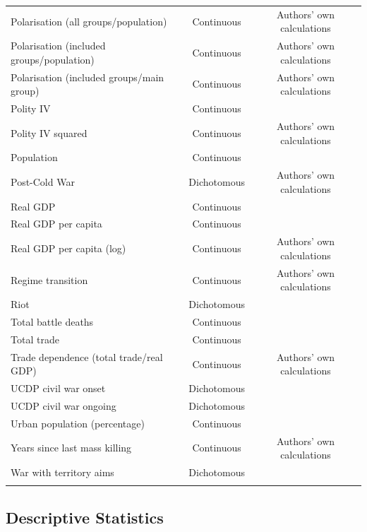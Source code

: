 \begin{table}[!htbp]
\begin{tabular}{@{\extracolsep{5pt}}lcc}
Polarisation (all groups/population) & Continuous &  Authors' own calculations  \\ 
Polarisation (included groups/population) & Continuous &  Authors' own calculations  \\ 
Polarisation (included groups/main group) & Continuous &  Authors' own calculations  \\ 
Polity IV & Continuous & \citet{marshall2017pitf}\\ 
Polity IV squared & Continuous & Authors' own calculations \\ 
Population & Continuous & \citet{gleditsch2002expanded} \\
Post-Cold War & Dichotomous & Authors' own calculations \\ 
Real GDP & Continuous & \citet{gleditsch2002expanded} \\ 
Real GDP per capita & Continuous & \citet{gleditsch2002expanded} \\ 
Real GDP per capita (log) & Continuous & Authors' own calculations  \\ 
Regime transition & Continuous & Authors' own calculations \\ 
Riot & Dichotomous & \citet{banks1999cross}\\ 
Total battle deaths & Continuous & \citet{lacina2005monitoring} \\  
Total trade & Continuous & \citet{cow2017cinc} \\ 
Trade dependence (total trade/real GDP) & Continuous & Authors' own calculations \\ 
UCDP civil war onset & Dichotomous & \citet{allansson2017organized,gleditsch2002armed} \\ 
UCDP civil war ongoing & Dichotomous & \citet{allansson2017organized,gleditsch2002armed} \\ 
Urban population (percentage) & Continuous & \citet{cow2017cinc} \\ 
Years since last mass killing & Continuous & Authors' own calculations \\ 
War with territory aims & Dichotomous & \citet{allansson2017organized,gleditsch2002armed} \\ 
\hline \\[-1.8ex] 
\end{tabular} 
\end{table} 

\newpage

\subsection{Descriptive Statistics}
\label{sec:mk-ds}

